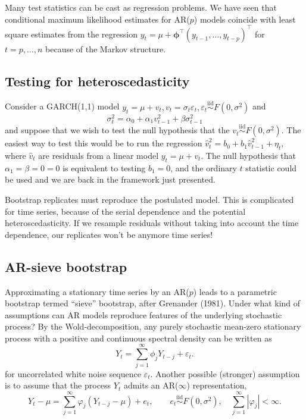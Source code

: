 \documentclass[]{book}
\begin{document}
Many test statistics can be cast as regression problems. We have seen
that conditional maximum likelihood estimates for AR(\(p\)) models
coincide with least square estimates from the regression
\(y_t=\mu+\boldsymbol{\phi}^\top(y_{t-1}, \ldots, y_{t-p})^\top\) for
\(t=p, \ldots, n\) because of the Markov structure.

\hypertarget{testing-for-heteroscedasticity}{%
\subsection{Testing for
heteroscedasticity}\label{testing-for-heteroscedasticity}}

Consider a GARCH(1,1) model
\(y_t=\mu + v_t, v_t = \sigma_t\varepsilon_t, \varepsilon_t \stackrel{\mathrm{iid}}{\sim}F(0,\sigma^2)\)
and
\[\sigma^2_t = \alpha_0 + \alpha_1 v_{t-1}^2 + \beta \sigma^2_{t-1}\]
and suppose that we wish to test the null hypothesis that the
\(v_t \stackrel{\mathrm{iid}}{\sim}F(0,\sigma^2)\). The easiest way to
test this would be to run the regression
\(\widehat{v}_t^2 = b_0 + b_1 \widehat{v}_{t-1}^2 + \eta_t\), where
\(\widehat{v}_t\) are residuals from a linear model \(y_t=\mu +v_t\).
The null hypothesis that \(\alpha_1=\beta=0=0\) is equivalent to testing
\(b_1=0\), and the ordinary \(t\) statistic could be used and we are
back in the framework just presented.

Bootstrap replicates must reproduce the postulated model. This is
complicated for time series, because of the serial dependence and the
potential heteroscedasticity. If we resample residuals without taking
into account the time dependence, our replicates won't be anymore time
series!

\hypertarget{ar-sieve-bootstrap}{%
\subsection{AR-sieve bootstrap}\label{ar-sieve-bootstrap}}

Approximating a stationary time series by an AR(\(p\)) leads to a
parametric bootstrap termed ``sieve'' bootstrap, after Grenander (1981).
Under what kind of assumptions can AR models reproduce features of the
underlying stochastic process? By the Wold-decomposition, any purely
stochastic mean-zero stationary process with a positive and continuous
spectral density can be written as
\[Y_t= \sum_{j=1}^\infty \phi_j Y_{t-j} + \varepsilon_t.\] for
uncorrelated white noise sequence \(\varepsilon_t\). Another possible
(stronger) assumption is to assume that the process \(Y_t\) admits an
AR(\(\infty\)) representation,
\[Y_t-\mu=\sum_{j=1}^\infty \varphi_j (Y_{t-j}-\mu) + e_t, \qquad e_t \stackrel{\mathrm{iid}}{\sim}F(0, \sigma^2), \quad \sum_{j=1}^\infty |\varphi_j| < \infty.\]
\end{document}
